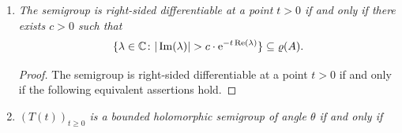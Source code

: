 \begin{example}
\begin{enumerate}[\upshape (i), wide, labelindent=.25em]
\begin{proof}
By hypothesis, the set 
%
\[
	H \coloneq \{m(x) \colon x \in X, \Re(m(x)) \geq b\} 
\]
%
in the case $E = C_{0}(X)$ 
and%
\[
	 H \coloneq \{\lambda \in \C \colon \Re(\lambda) \geq b \text{ and for all } \eta > 0,  
\mu(\{x \in X \colon |m(x)-\lambda| < \eta \}) \neq 0\}
\]
%
in the case $E = L^{p}$ is a bounded subset of\/ $\C$.
Thus $\lim_{t \to t'} |\eu^{tz} - \eu^{t'z}| = 0$ uniformly for $z \in H$.
Hence there exists $\delta \in (0,t'/2]$ such that
\[
[\text{ess}]\text{-}\sup\left\{\left|\eu^{tm(x)} - \eu^{t'm(x)}\right| \colon x \in X, \Re(m(x)) > b\right\} < \epsilon
\] 
whenever $|t-t'| < \delta$.
Together with the inequality above, we obtain that 
\[
\|T(t) - T(t')\| = [\text{ess}]\text{-}\sup\left\{\left|\eu^{tm(x)} - \eu^{t'm(x)}\right| \colon x \in X\right\} < \epsilon
\]
whenever $|t-t'| < \delta$.
We have shown that the semigroup is norm continuous for $t > 0$ whenever $\{\lambda \in \sigma(A) \colon \Re(\lambda) \geq b\}$ is bounded for all $b \in \R$.
\end{proof}
\item \label{ex:a2-1.28-2}
\textit{The semigroup is right-sided differentiable at a point $t > 0$ 
if and only if there exists $c > 0$ such that}
%
\[
	\{\lambda \in \C \colon |\Im(\lambda)| > c \cdot \eu^{-t\Re(\lambda)}\} \subseteq \rho(A) .
\]
%
\begin{proof}
The semigroup is right-sided differentiable at a point $t > 0$ if and only if the following equivalent assertions hold.
\end{proof}
\item \label{ex:a2-1.28-3}
\textit{$(T(t))_{t \geq 0}$ is a bounded holomorphic semigroup of angle $\theta$ if and only if} 

\end{enumerate}
\end{example}
